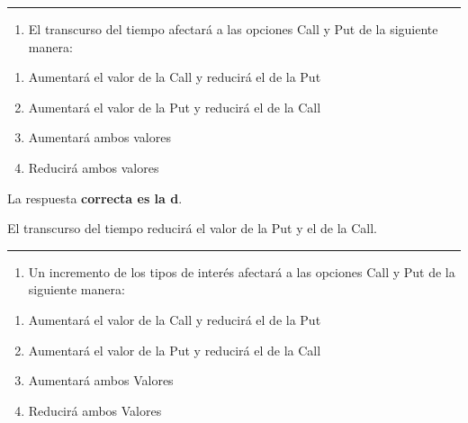 \documentclass[
  letterpaper,
  DIV=11,
  numbers=noendperiod]{scrreprt}
\providecommand{\tightlist}{%
  \setlength{\itemsep}{0pt}\setlength{\parskip}{0pt}}\usepackage{longtable,booktabs,array}
\begin{document}
\begin{center}\rule{0.5\linewidth}{0.5pt}\end{center}

\begin{enumerate}
\def\labelenumi{\arabic{enumi}.}
\setcounter{enumi}{42}
\tightlist
\item
  El transcurso del tiempo afectará a las opciones Call y Put de la
  siguiente manera:
\end{enumerate}

\begin{enumerate}
\def\labelenumi{\alph{enumi})}
\item
  Aumentará el valor de la Call y reducirá el de la Put
\item
  Aumentará el valor de la Put y reducirá el de la Call
\item
  Aumentará ambos valores
\item
  Reducirá ambos valores
\end{enumerate}

\begin{tcolorbox}[enhanced jigsaw, left=2mm, opacityback=0, colback=white, breakable, arc=.35mm, bottomrule=.15mm, rightrule=.15mm, toprule=.15mm, leftrule=.75mm, colframe=quarto-callout-tip-color-frame]
\begin{minipage}[t]{5.5mm}
\textcolor{quarto-callout-tip-color}{\faLightbulb}
\end{minipage}%
\begin{minipage}[t]{\textwidth - 5.5mm}

La respuesta \textbf{correcta es la d}.

El transcurso del tiempo reducirá el valor de la Put y el de la Call.

\end{minipage}%
\end{tcolorbox}

\begin{center}\rule{0.5\linewidth}{0.5pt}\end{center}

\begin{enumerate}
\def\labelenumi{\arabic{enumi}.}
\setcounter{enumi}{43}
\tightlist
\item
  Un incremento de los tipos de interés afectará a las opciones Call y
  Put de la siguiente manera:
\end{enumerate}

\begin{enumerate}
\def\labelenumi{\alph{enumi})}
\item
  Aumentará el valor de la Call y reducirá el de la Put
\item
  Aumentará el valor de la Put y reducirá el de la Call
\item
  Aumentará ambos Valores
\item
  Reducirá ambos Valores
\end{enumerate}
\end{document}
